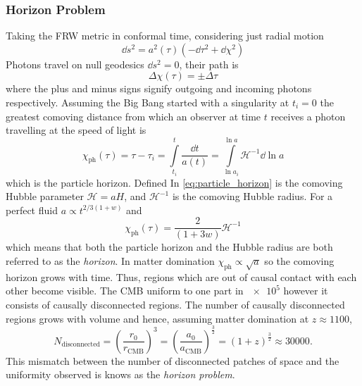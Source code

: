 \subsubsection{Horizon Problem}

Taking the FRW metric in conformal time, considering just radial motion
%
\begin{equation}
	\dd{s^{2}}
	= a^{2}(\tau)(-\dd{\tau^{2}} + \dd{\chi^{2}})
\end{equation}
%
Photons travel on null geodesics \(\dd{s^{2}}=0\), their path is
%
\begin{equation}
	\Delta\chi(\tau)
	= \pm\Delta\tau
\end{equation}
%
where the plus and minus signs signify outgoing and incoming photons respectively.
Assuming the Big Bang started with a singularity at \(t_{i}=0\) the greatest comoving distance from which an observer at time \(t\) receives a photon travelling at the speed of light is
%
\begin{equation}\label{eq:particle_horizon}
	\chi_{\text{ph}}(\tau)
	= \tau - \tau_{i} = \int\limits_{t_{i}}^{t} \frac{\dd{t}}{a(t)}
	= \int\limits_{\ln{a_{i}}}^{\ln{a}} \mathcal{H}^{-1} \dd{\ln{a}}
\end{equation}
%
which is the particle horizon.
Defined In \cref{eq:particle_horizon} is the comoving Hubble parameter \(\mathcal{H}=aH\), and \(\mathcal{H}^{-1}\) is the comoving Hubble radius.
For a perfect fluid \(a \propto t^{2/3(1+w)}\) and
%
\begin{equation}
	\chi_{\text{ph}}(\tau)
	= \frac{2}{(1+3w)} \mathcal{H}^{-1}
\end{equation}
%
which means that both the particle horizon and the Hubble radius are both referred to as the \emph{horizon}.
In matter domination \(\chi_{\text{ph}} \propto \sqrt{a}\) so the comoving horizon grows with time.
Thus, regions which are out of causal contact with each other become visible.
The CMB uniform to one part in \(\num{e5}\) however it consists of causally disconnected regions.
The number of causally disconnected regions grows with volume and hence, assuming matter domination at \(z \approx \num{1100}\),
%
\begin{equation}
	N_{\text{disconnected}}
		= {\left(\frac{r_{0}}{r_{\text{CMB}}}\right)}^{3}
		= {\left(\frac{a_{0}}{a_{\text{CMB}}}\right)}^{\frac{3}{2}}
		= {(1+z)}^{\frac{3}{2}}
	\approx \num{30000}.
\end{equation}
%
This mismatch between the number of disconnected patches of space and the uniformity observed is knows as the \emph{horizon problem}.

